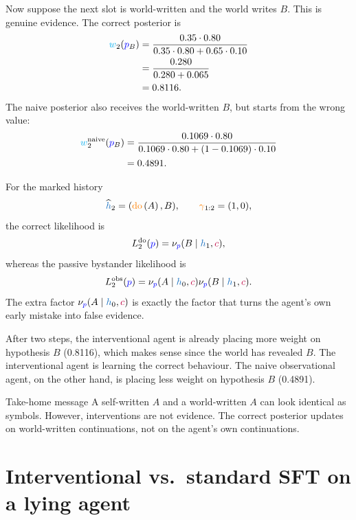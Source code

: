 \documentclass[11pt]{article}
\newcommand{\program}{\ensuremath{\textcolor{blue}{p}}}
\newcommand{\contextsym}{\ensuremath{\textcolor{purple}{c}}}
\newcommand{\gate}{\ensuremath{\textcolor{orange}{\gamma}}}
\newcommand{\weight}{\ensuremath{\textcolor{cyan}{w}}}
\newcommand{\history}{\ensuremath{\textcolor{RoyalBlue}{h}}}
\newcommand{\kernel}{\ensuremath{\nu}}
\newcommand{\lik}{\ensuremath{L}}
\newcommand{\obslik}{\ensuremath{\lik^{\mathrm{obs}}}}
\newcommand{\dolik}{\ensuremath{\lik^{\mathrm{do}}}}
\newcommand{\naiveweight}{\ensuremath{\weight^{\mathrm{naive}}}}
\newcommand{\dohistory}{\ensuremath{\widehat{\history}}}
\newcommand{\doop}{\operatorname{\textcolor{orange}{do}}}
\newcommand{\intervene}[1]{\ensuremath{\doop \left(#1\right)}}
\newcommand{\trueprog}{\ensuremath{\program_B}}
\begin{document}
Now suppose the next slot is world-written and the world writes \(B\). This is
genuine evidence. The correct posterior is
\[
\begin{aligned}
\weight_2(\trueprog)
&=
\frac{0.35\cdot 0.80}
     {0.35\cdot 0.80+0.65\cdot 0.10}\\
&=
\frac{0.280}{0.280+0.065}\\
&=0.8116.
\end{aligned}
\]
The naive posterior also receives the world-written \(B\), but starts from the
wrong value:
\[
\begin{aligned}
\naiveweight_2(\trueprog)
&=
\frac{0.1069\cdot 0.80}
     {0.1069\cdot 0.80+(1-0.1069)\cdot 0.10}\\
&=0.4891.
\end{aligned}
\]

For the marked history
\[
  \dohistory_2=(\intervene{A},B),
  \qquad
  \gate_{1:2}=(1,0),
\]
the correct likelihood is
\[
  \dolik_2(\program)
  =
  \kernel_{\program}(B\mid \history_1,\contextsym),
\]
whereas the passive bystander likelihood is
\[
  \obslik_2(\program)
  =
  \kernel_{\program}(A\mid \history_0,\contextsym)
  \kernel_{\program}(B\mid \history_1,\contextsym).
\]
The extra factor \(\kernel_{\program}(A\mid \history_0,\contextsym)\) is exactly
the factor that turns the agent's own early mistake into false evidence.

After two steps, the interventional agent is already placing more weight on hypothesis $B$ (0.8116), which makes sense since the world has revealed $B$. The interventional agent is learning the correct behaviour. The naive observational agent, on the other hand, is placing less weight on hypothesis $B$ (0.4891). 


\begin{warningbox}{Take-home message}
A self-written \(A\) and a world-written \(A\) can look identical as symbols.
However, interventions are not 
evidence. The correct posterior updates on world-written continuations, not on
the agent's own continuations.
\end{warningbox}






\section{Interventional vs.\ standard SFT on a lying agent}
\label{sec:experiment-sft}
\end{document}
